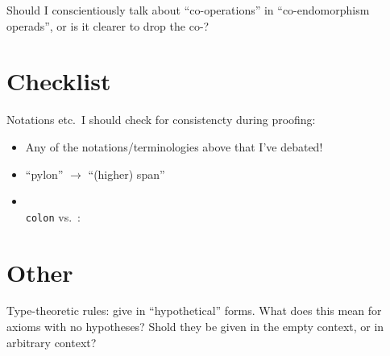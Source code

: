 \documentclass{amsart}
\begin{document}
\para Should I conscientiously talk about ``co-operations'' in ``co-endomorphism operads'', or is it clearer to drop the co-?

\section{Checklist}  Notations etc.\ I should check for consistencty during proofing:
\begin{itemize}
\item Any of the notations/terminologies above that I've debated!
\item ``pylon'' $\longrightarrow$ ``(higher) span''
\item \texttt{\\colon} vs.\ :
\end{itemize}

\section{Other}

\para Type-theoretic rules: give in ``hypothetical'' forms.  What does this mean for axioms with no hypotheses?  Shold they be given in the empty context, or in arbitrary context? 
\end{document}
